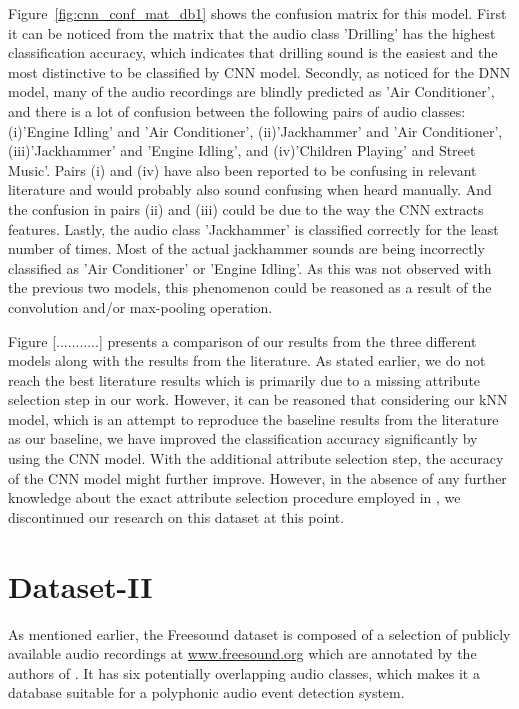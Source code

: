 Figure~\ref{fig:cnn_conf_mat_db1} shows the confusion matrix for this model. First it can be noticed from the matrix that the audio class 'Drilling' has the highest classification accuracy, which indicates that drilling sound is the easiest and the most distinctive to be classified by CNN model. Secondly, as noticed for the DNN model, many of the audio recordings are blindly predicted as 'Air Conditioner', and there is a lot of confusion between the following pairs of audio classes: (i)'Engine Idling' and 'Air Conditioner', (ii)'Jackhammer' and 'Air Conditioner', (iii)'Jackhammer' and 'Engine Idling', and (iv)'Children Playing' and Street Music'. Pairs (i) and (iv) have also been reported to be confusing in relevant literature and would probably also sound confusing when heard manually. And the confusion in pairs (ii) and (iii) could be due to the way the CNN extracts features. Lastly, the audio class 'Jackhammer' is classified correctly for the least number of times. Most of the actual jackhammer sounds are being incorrectly classified as 'Air Conditioner' or 'Engine Idling'. As this was not observed with the previous two models, this phenomenon could be reasoned as a result of the convolution and/or max-pooling operation.

Figure [...........] presents a comparison of our results from the three different models along with the results from the literature. As stated earlier, we do not reach the best literature results which is primarily due to a missing attribute selection step in our work. However, it can be reasoned that considering our kNN model, which is an attempt to reproduce the baseline results from the literature as our baseline, we have improved the classification accuracy significantly by using the CNN model. With the additional attribute selection step, the accuracy of the CNN model might further improve. However, in the absence of any further knowledge about the exact attribute selection procedure employed in \cite{salamon2014dataset}, we discontinued our research on this dataset at this point.


\section{Dataset-II}
As mentioned earlier, the Freesound dataset is composed of a selection of publicly available audio recordings at \url{www.freesound.org} which are annotated by the authors of \cite{kons2013audio}. It has six potentially overlapping audio classes, which makes it a database suitable for a polyphonic audio event detection system. 

